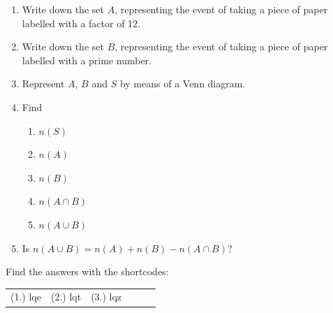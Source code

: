 \begin{enumerate}[noitemsep, label=\textbf{\arabic*}. ]
\begin{enumerate}[noitemsep, label=\textbf{\alph*}. ]
\label{m39377*uid26}\item Write down the set $A$, representing the event of taking a
piece of paper labelled with a factor of 12.
\label{m39377*uid27}\item Write down the set $B$, representing the event of taking a
piece of paper labelled with a prime number.
\label{m39377*uid28}\item Represent $A$, $B$ and $S$ by means of a Venn diagram.
\label{m39377*uid29}\item Find
\label{m39377*id111546}\begin{enumerate}[noitemsep, label=\textbf{\roman*}. ] 
            \label{m39377*uid30}\item $n\left(S\right)$\label{m39377*uid31}\item $n\left(A\right)$\label{m39377*uid32}\item $n\left(B\right)$\label{m39377*uid33}\item $n\left(A\cap B\right)$\label{m39377*uid34}\item $n\left(A\cup B\right)$\end{enumerate}
        \label{m39377*uid35}\item Is $n\left(A\cup B\right)=n\left(A\right)+n\left(B\right)-n\left(A\cap B\right)$?
\end{enumerate}
                \end{enumerate}
  \label{m39377**end}
\par {} Find the answers with the shortcodes:
 \par \begin{tabular}[h]{cccccc}
 (1.) lqe  &  (2.) lqt  &  (3.) lqz  & \end{tabular}
%     
%     
%     
%     
%     
    \label{m39373*cid5}
